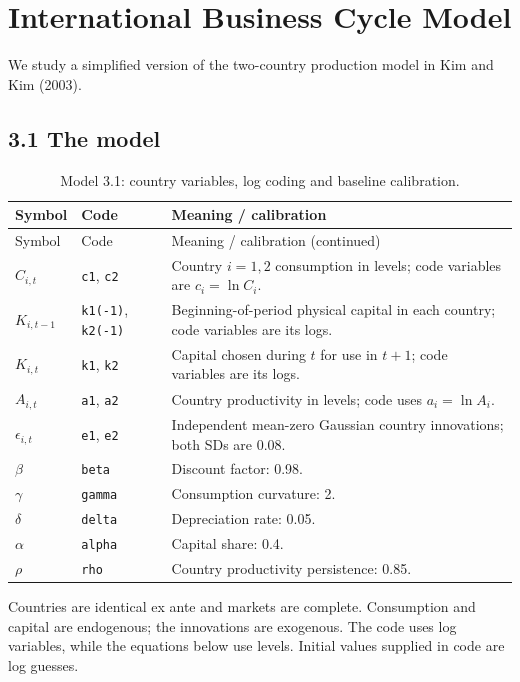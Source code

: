 \documentclass[12pt]{article}
\begin{document}
\section{International Business Cycle Model}
We study a simplified version of the two-country production model in Kim and Kim (2003).

\subsection*{3.1 The model}


\begingroup
\small
\captionsetup{labelformat=empty}
\begin{longtable}{p{}p{}p{}}
\caption{Model 3.1: country variables, log coding and baseline calibration.}\\
\hline
Symbol & Code & Meaning / calibration \\
\hline
\endfirsthead
Symbol & Code & Meaning / calibration (continued) \\
\hline
\endhead
$C_{i,t}$ & \texttt{c1}, \texttt{c2} & Country $i=1,2$ consumption in levels; code variables are $c_i=\ln C_i$. \\
$K_{i,t-1}$ & \texttt{k1(-1)}, \texttt{k2(-1)} & Beginning-of-period physical capital in each country; code variables are its logs. \\
$K_{i,t}$ & \texttt{k1}, \texttt{k2} & Capital chosen during $t$ for use in $t+1$; code variables are its logs. \\
$A_{i,t}$ & \texttt{a1}, \texttt{a2} & Country productivity in levels; code uses $a_i=\ln A_i$. \\
$\epsilon_{i,t}$ & \texttt{e1}, \texttt{e2} & Independent mean-zero Gaussian country innovations; both SDs are 0.08. \\
$\beta$ & \texttt{beta} & Discount factor: 0.98. \\
$\gamma$ & \texttt{gamma} & Consumption curvature: 2. \\
$\delta$ & \texttt{delta} & Depreciation rate: 0.05. \\
$\alpha$ & \texttt{alpha} & Capital share: 0.4. \\
$\rho$ & \texttt{rho} & Country productivity persistence: 0.85. \\
\hline
\end{longtable}
\noindent Countries are identical ex ante and markets are complete. Consumption and capital are endogenous; the innovations are exogenous. The code uses log variables, while the equations below use levels. Initial values supplied in code are log guesses.
\endgroup
\end{document}
